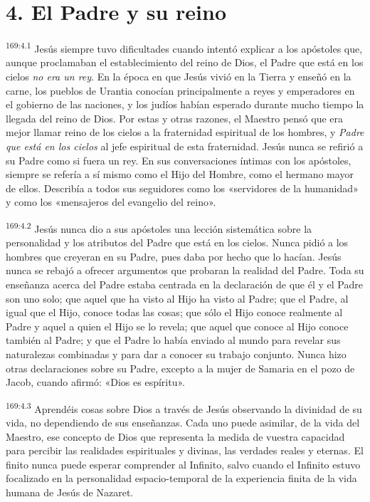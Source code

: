 \section*{4. El Padre y su reino}
\par 
\textsuperscript{169:4.1} Jesús siempre tuvo dificultades cuando intentó explicar a los apóstoles que, aunque proclamaban el establecimiento del reino de Dios, el Padre que está en los cielos \textit{no era un rey}. En la época en que Jesús vivió en la Tierra y enseñó en la carne, los pueblos de Urantia conocían principalmente a reyes y emperadores en el gobierno de las naciones, y los judíos habían esperado durante mucho tiempo la llegada del reino de Dios. Por estas y otras razones, el Maestro pensó que era mejor llamar reino de los cielos a la fraternidad espiritual de los hombres, y \textit{Padre que está en los cielos} al jefe espiritual de esta fraternidad. Jesús nunca se refirió a su Padre como si fuera un rey. En sus conversaciones íntimas con los apóstoles, siempre se refería a sí mismo como el Hijo del Hombre, como el hermano mayor de ellos. Describía a todos sus seguidores como los «servidores de la humanidad» y como los «mensajeros del evangelio del reino».

\par 
\textsuperscript{169:4.2} Jesús nunca dio a sus apóstoles una lección sistemática sobre la personalidad y los atributos del Padre que está en los cielos. Nunca pidió a los hombres que creyeran en su Padre, pues daba por hecho que lo hacían. Jesús nunca se rebajó a ofrecer argumentos que probaran la realidad del Padre. Toda su enseñanza acerca del Padre estaba centrada en la declaración de que él y el Padre son uno solo; que aquel que ha visto al Hijo ha visto al Padre; que el Padre, al igual que el Hijo, conoce todas las cosas; que sólo el Hijo conoce realmente al Padre y aquel a quien el Hijo se lo revela; que aquel que conoce al Hijo conoce también al Padre; y que el Padre lo había enviado al mundo para revelar sus naturalezas combinadas y para dar a conocer su trabajo conjunto. Nunca hizo otras declaraciones sobre su Padre, excepto a la mujer de Samaria en el pozo de Jacob, cuando afirmó: «Dios es espíritu».

\par 
\textsuperscript{169:4.3} Aprendéis cosas sobre Dios a través de Jesús observando la divinidad de su vida, no dependiendo de sus enseñanzas. Cada uno puede asimilar, de la vida del Maestro, ese concepto de Dios que representa la medida de vuestra capacidad para percibir las realidades espirituales y divinas, las verdades reales y eternas. El finito nunca puede esperar comprender al Infinito, salvo cuando el Infinito estuvo focalizado en la personalidad espacio-temporal de la experiencia finita de la vida humana de Jesús de Nazaret.

